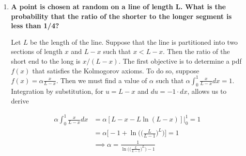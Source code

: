 \documentclass[10pt, oneside]{article}
\begin{document}
\begin{enumerate}[label=4.\arabic*]
\begin{enumerate}
	\item  \begin{tcolorbox}[
	  colback=Cerulean!5!white,
	  colframe=Cerulean!75!black]
	\textbf{$\bm{P(X < 1/2) = 0.3}$}
	\end{tcolorbox}
	
	\begin{align*}
	P(X < 1/2) &= \int^{1/2}_{0} \frac{1}{\alpha} dx = 0.3 \\
	&= \frac{x}{\alpha} \Big|^{1/2}_{0} = \frac{1}{2\alpha} = 0.3 \\
	&\implies \boxed{\alpha = 5/3}
	\end{align*}
	
	\item  \begin{tcolorbox}[
	  colback=Cerulean!5!white,
	  colframe=Cerulean!75!black]
	\textbf{$\bm{P(|X| < 1) = P(|X| > 1)}$}
	\end{tcolorbox}
	
	\begin{align*}
	\int^1_0 \frac{1}{\alpha} dx &= \int^\alpha_1 \frac{1}{\alpha}dx \\
	\implies \frac{x}{\alpha} \Big|^1_0 &= \frac{x}{\alpha} \Big|^\alpha_1 \\
	\implies \frac{1}{\alpha} &= 1 - \frac{1}{\alpha} \\
	\implies \boxed{\alpha = 2}
	\end{align*}
	\end{enumerate}

\item  \begin{tcolorbox}[
  colback=Cerulean!5!white,
  colframe=Cerulean!75!black]
\textbf{A point is chosen at random on a line of length $\bm{L}$. What is the probability that the ratio of the shorter to the longer segment is less than 1/4?}
\end{tcolorbox}

Let $L$ be the length of the line. Suppose that the line is partitioned into two sections of length $x$ and $L-x$ such that $x < L-x$. Then the ratio of the short end to the long is $x / (L-x)$. The first objective is to determine a pdf $f(x)$ that satisfies the Kolmogorov axioms. To do so, suppose $f(x) = \alpha \frac{x}{L-x}$. Then we must find a value of $\alpha$ such that $\alpha \int^1_0 \frac{x}{L-x}dx = 1$. Integration by substitution, for $u = L-x$ and $du = -1 \cdot dx$, allows us to derive

\begin{align*}
\alpha \int^1_0 \frac{x}{L-x}dx &= \alpha [L - x - L \ln (L-x)] \Big|^1_0 = 1 \\
&= \alpha \Bigg[ -1 + \ln \Bigg( \Bigg( \frac{L}{L-1} \Bigg)^L \Bigg) \Bigg] = 1 \\
&\implies \boxed{\alpha = \frac{1}{\ln \Big( \Big( \frac{L}{L-1} \Big)^L \Big) - 1}}
\end{align*}


\end{enumerate}
\end{document}
